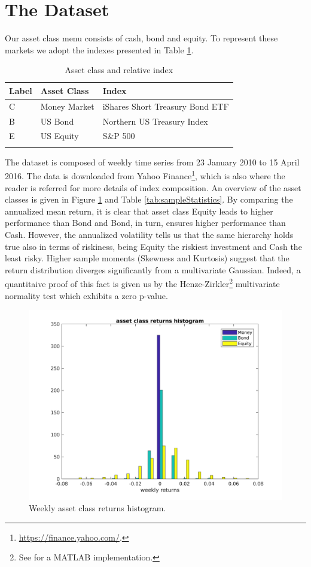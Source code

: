 \section{The Dataset}\label{sec:The_Dataset}
Our asset class menu consists of cash, bond and equity. To represent these markets we adopt the indexes presented in Table \ref{tab:indexes}.
\begin{table}[]
	\centering
	\begin{tabular}{@{}lll@{}} \toprule
		Label & Asset Class & Index\\ \midrule
		C & Money Market & iShares Short Treasury Bond ETF\\
		\addlinespace[0.5em]
		B & US Bond  & Northern US Treasury Index \\
		\addlinespace[0.5em]
	    E &	US Equity &  {S\&P 500}\\ \bottomrule
		\addlinespace[0.5em]
	\end{tabular}
	\caption{Asset class and relative index}
	\label{tab:indexes}
\end{table}
The dataset is composed of weekly time series from 23 January 2010 to 15 April 2016. The data is downloaded from Yahoo Finance\footnote{\url{https://finance.yahoo.com/}.}, which is also where the reader is referred for more details of index composition. An overview of the asset classes is given in Figure \ref{fig:assetclassReturns} and Table \ref{tab:sampleStatistics}. By comparing the annualized mean return, it is clear that asset class Equity leads to higher performance than Bond and Bond, in turn, ensures higher performance than Cash. However, the annualized volatility tells us that the same hierarchy holds true also in terms of riskiness, being Equity the riskiest investment and Cash the least risky. Higher sample moments (Skewness and Kurtosis) suggest that the return distribution diverges significantly from a multivariate Gaussian. Indeed, a quantitaive proof of this fact is given us by the Henze-Zirkler\footnote{See \cite{NormTest} for a MATLAB implementation.} multivariate normality test which exhibits a zero p-value. 
\begin{figure}[h]\label{fig:assetclassReturns}
	\centering
	\includegraphics[scale=0.6]{Images/ReturnsHist.png}
	\caption{Weekly asset class returns histogram.}
\end{figure}
